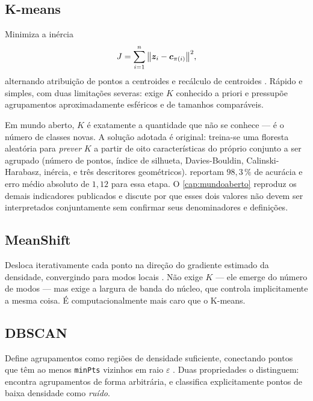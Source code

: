 \subsection{K-means}

Minimiza a inércia
\begin{equation}
  J = \sum_{i=1}^{n} \big\| \bm{z}_i - \bm{c}_{\pi(i)} \big\|^2,
  \label{eq:kmeans}
\end{equation}
alternando atribuição de pontos a centroides e recálculo de centroides
\citep{Lloyd1982}. Rápido e simples, com duas limitações severas: exige $K$ conhecido a
priori e pressupõe agrupamentos aproximadamente esféricos e de tamanhos comparáveis.

\begin{destaque}
Em mundo aberto, $K$ é exatamente a quantidade que não se conhece --- é o número de
classes novas. A solução adotada é original: treina-se uma floresta aleatória para
\emph{prever} $K$ a partir de oito características do próprio conjunto a ser agrupado
(número de pontos, índice de silhueta, Davies-Bouldin, Calinski-Harabasz, inércia, e
três descritores geométricos). \citet{Lopes2025EAAI} reportam $98{,}3\,\%$ de acurácia
e erro médio absoluto de $1{,}12$ para essa etapa. O \cref{cap:mundoaberto} reproduz os
demais indicadores publicados e discute por que esses dois valores não devem ser
interpretados conjuntamente sem confirmar seus denominadores e definições.
\end{destaque}

\subsection{MeanShift}

Desloca iterativamente cada ponto na direção do gradiente estimado da densidade,
convergindo para modos locais \citep{meanshift}. Não exige $K$ --- ele emerge do número
de modos --- mas exige a largura de banda do núcleo, que controla implicitamente a
mesma coisa. É computacionalmente mais caro que o K-means.

\subsection{DBSCAN}

Define agrupamentos como regiões de densidade suficiente, conectando pontos que têm ao
menos \texttt{minPts} vizinhos em raio $\varepsilon$ \citep{dbscan}. Duas propriedades o
distinguem: encontra agrupamentos de forma arbitrária, e classifica explicitamente
pontos de baixa densidade como \emph{ruído}.

